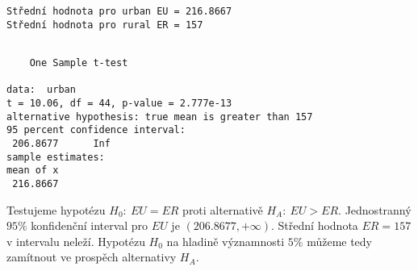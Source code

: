\documentclass[11pt]{article}
\begin{document}
    \begin{Verbatim}[commandchars=\\\{\}]
Střední hodnota pro urban EU = 216.8667 
Střední hodnota pro rural ER = 157 
    \end{Verbatim}

    
    \begin{verbatim}

    One Sample t-test

data:  urban
t = 10.06, df = 44, p-value = 2.777e-13
alternative hypothesis: true mean is greater than 157
95 percent confidence interval:
 206.8677      Inf
sample estimates:
mean of x 
 216.8667 
    \end{verbatim}

\noindent Testujeme hypotézu $H_0:\ EU = ER$ proti alternativě $H_A:\ EU > ER$. 
Jednostranný $95\%$ konfidenční interval pro $EU$ je $(206.8677,+\infty)$. 
Střední hodnota $ER = 157$ v intervalu neleží. 
Hypotézu $H_0$ na hladině významnosti $5\%$ můžeme tedy zamítnout ve prospěch alternativy $H_A$.

    
    
    
    
\end{document}
